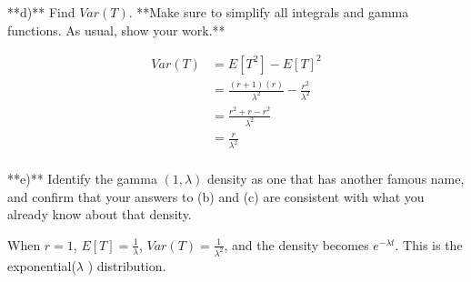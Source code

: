 \documentclass{report}
\begin{document}
**d)** Find $Var(T)$. **Make sure to simplify all integrals and gamma functions. As usual, show your work.** 

\begin{align*}
	Var(T) &= E[T^{2}] - E[T]^{2} \\
	&= \frac{(r+1)(r)}{\lambda^{2}} - \frac{r^{2}}{\lambda^{2}} \\
	&= \frac{r^{2}+r - r^{2}}{\lambda^{2}} \\
	&= \frac{r}{\lambda^{2}} \\
\end{align*}





**e)** Identify the gamma $(1, \lambda)$ density as one that has another famous name, and confirm that your answers to (b) and (c) are consistent with what you already know about that density.


When $ r=1 $, $ E[T] = \frac{1}{\lambda} $, $ Var(T) = \frac{1}{\lambda^{2}} $, and the density becomes $ e^{-\lambda t}$. This is the exponential($ \lambda $ ) distribution. 
\end{document}
